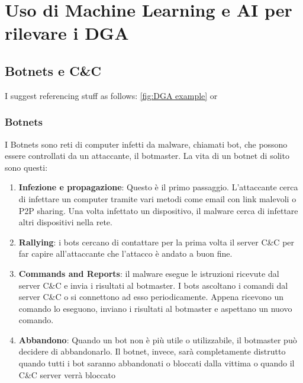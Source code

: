 \documentclass[12pt,a4paper,openright,twoside]{book}
\begin{document}

\chapter{Uso di Machine Learning e AI per rilevare i DGA}

\section{Botnets e C\&C}
I suggest referencing stuff as follows: \cref{fig:DGA example} or 

\subsection{Botnets}

I Botnets sono reti di computer infetti da malware, chiamati bot,
che possono essere controllati da un attaccante, il botmaster.
La vita di un botnet di solito sono questi:
\begin{enumerate}
    \item \textbf{Infezione e propagazione}: Questo è il primo
    passaggio. L'attaccante cerca di infettare un computer
    tramite vari metodi come email con link malevoli o \acrfull{P2P} sharing.
    Una volta infettato un dispositivo, il malware cerca di infettare
    altri dispositivi nella rete.

    \item \textbf{Rallying}: i bots cercano di contattare per la prima volta
    il server \acrshort{C&C} per far capire all'attaccante
    che l'attacco è andato a buon fine.

    \item \textbf{Commands and Reports}: il malware esegue le istruzioni
    ricevute dal server \acrshort{C&C} e invia i risultati al botmaster.
    I bots ascoltano i comandi dal server \acrshort{C&C} 
    o si connettono ad esso periodicamente. Appena ricevono
    un comando lo eseguono, inviano i risultati al botmaster
    e aspettano un nuovo comando.

    \item \textbf{Abbandono}: Quando un bot non è più utile o utilizzabile,
    il botmaster può decidere di abbandonarlo. Il botnet, invece,
    sarà completamente distrutto quando tutti i bot saranno
    abbandonati o bloccati dalla vittima o quando il \acrshort{C&C} server
    verrà bloccato


\end{enumerate}
\end{document}
